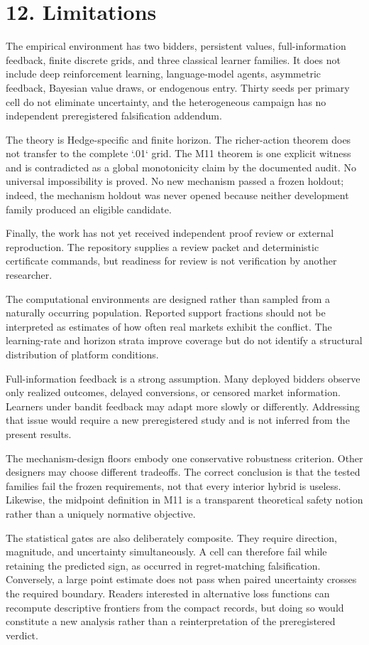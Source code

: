 \documentclass[11pt]{article}
\begin{document}
\section{12. Limitations}
The empirical environment has two bidders, persistent values, full-information feedback, finite discrete grids, and three classical learner families. It does not include deep reinforcement learning, language-model agents, asymmetric feedback, Bayesian value draws, or endogenous entry. Thirty seeds per primary cell do not eliminate uncertainty, and the heterogeneous campaign has no independent preregistered falsification addendum.

The theory is Hedge-specific and finite horizon. The richer-action theorem does not transfer to the complete `.01` grid. The M11 theorem is one explicit witness and is contradicted as a global monotonicity claim by the documented audit. No universal impossibility is proved. No new mechanism passed a frozen holdout; indeed, the mechanism holdout was never opened because neither development family produced an eligible candidate.

Finally, the work has not yet received independent proof review or external reproduction. The repository supplies a review packet and deterministic certificate commands, but readiness for review is not verification by another researcher.

The computational environments are designed rather than sampled from a naturally occurring population. Reported support fractions should not be interpreted as estimates of how often real markets exhibit the conflict. The learning-rate and horizon strata improve coverage but do not identify a structural distribution of platform conditions.

Full-information feedback is a strong assumption. Many deployed bidders observe only realized outcomes, delayed conversions, or censored market information. Learners under bandit feedback may adapt more slowly or differently. Addressing that issue would require a new preregistered study and is not inferred from the present results.

The mechanism-design floors embody one conservative robustness criterion. Other designers may choose different tradeoffs. The correct conclusion is that the tested families fail the frozen requirements, not that every interior hybrid is useless. Likewise, the midpoint definition in M11 is a transparent theoretical safety notion rather than a uniquely normative objective.

The statistical gates are also deliberately composite. They require direction, magnitude, and uncertainty simultaneously. A cell can therefore fail while retaining the predicted sign, as occurred in regret-matching falsification. Conversely, a large point estimate does not pass when paired uncertainty crosses the required boundary. Readers interested in alternative loss functions can recompute descriptive frontiers from the compact records, but doing so would constitute a new analysis rather than a reinterpretation of the preregistered verdict.
\end{document}
